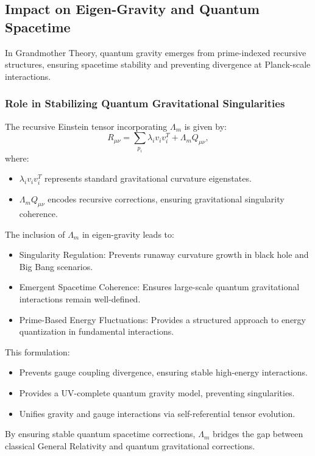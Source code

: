 \documentclass{article}
\theoremstyle{plain}
\begin{document}
\subsection{Impact on Eigen-Gravity and Quantum Spacetime}
In Grandmother Theory, quantum gravity emerges from prime-indexed recursive structures, ensuring spacetime stability and preventing divergence at Planck-scale interactions.

\subsubsection{Role in Stabilizing Quantum Gravitational Singularities}
The recursive Einstein tensor incorporating $\Lambda_m$ is given by:
\begin{equation}
    R_{\mu\nu} = \sum_{p_i} \lambda_i v_i v^T_i + \Lambda_m Q_{\mu\nu},
\end{equation}
where:
\begin{itemize}
    \item $\lambda_i v_i v^T_i$ represents standard gravitational curvature eigenstates.
    \item $\Lambda_m Q_{\mu\nu}$ encodes recursive corrections, ensuring gravitational singularity coherence.
\end{itemize}

The inclusion of $\Lambda_m$ in eigen-gravity leads to:
\begin{itemize}
    \item Singularity Regulation: Prevents runaway curvature growth in black hole and Big Bang scenarios.
    \item Emergent Spacetime Coherence: Ensures large-scale quantum gravitational interactions remain well-defined.
    \item Prime-Based Energy Fluctuations: Provides a structured approach to energy quantization in fundamental interactions.
\end{itemize}
This formulation:
\begin{itemize}
    \item Prevents gauge coupling divergence, ensuring stable high-energy interactions.
    \item Provides a UV-complete quantum gravity model, preventing singularities.
    \item Unifies gravity and gauge interactions via self-referential tensor evolution.
\end{itemize}

By ensuring stable quantum spacetime corrections, $\Lambda_m$ bridges the gap between classical General Relativity and quantum gravitational corrections.
\end{document}
